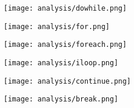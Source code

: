 \begin{multicols}{2}
\begin{center}
\texttt{[image: analysis/dowhile.png]} 
\end{center}
\columnbreak
\begin{center}
\texttt{[image: analysis/for.png]} 
\end{center}
\end{multicols}

\begin{multicols}{2}
\begin{center}
\texttt{[image: analysis/foreach.png]} 
\end{center}
\columnbreak
\begin{center}
\texttt{[image: analysis/iloop.png]} 
\end{center}
\end{multicols}

\begin{multicols}{2}
\begin{center}
\texttt{[image: analysis/continue.png]} 
\end{center}
\columnbreak
\begin{center}
\texttt{[image: analysis/break.png]} 
\end{center}
\end{multicols}

